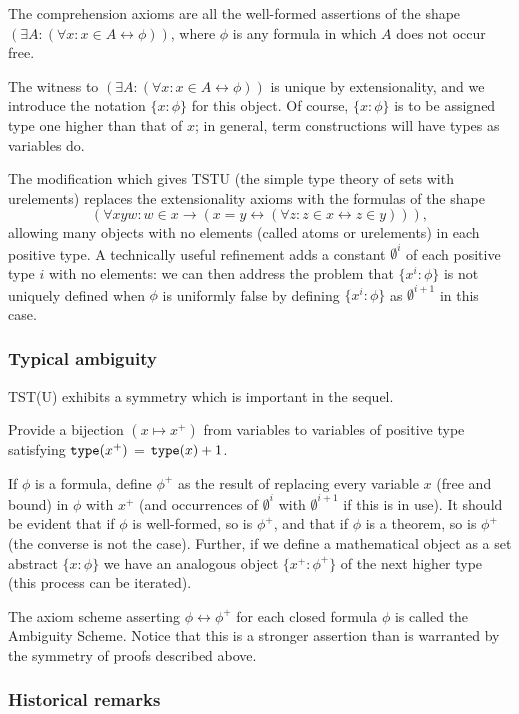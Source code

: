 \documentclass[112pt]{article}
\begin{document}
The comprehension axioms are all the well-formed assertions of the shape $(\exists A:(\forall x:x \in A \leftrightarrow \phi))$, where $\phi$ is any formula in which $A$ does not occur free.

The witness to $(\exists A:(\forall x:x \in A \leftrightarrow \phi))$ is unique by extensionality, and we introduce the notation $\{x:\phi\}$ for this object.  Of course, $\{x:\phi\}$  is to be assigned type one higher than that of $x$;  in general, term constructions will have types as variables do.

The modification which gives TSTU (the simple type theory of sets with urelements) replaces the extensionality axioms with the formulas of the shape $$(\forall xyw:w \in x \rightarrow (x=y \leftrightarrow (\forall z:z \in x \leftrightarrow z\in y))),$$  allowing many objects with no elements (called atoms or urelements)  in each positive type.  A technically useful refinement adds a constant $\emptyset^i$ of each positive type $i$ with no elements:  we can then address the problem that $\{x^i:\phi\}$ is not uniquely defined when $\phi$ is uniformly false by defining $\{x^i:\phi\}$ as $\emptyset^{i+1}$ in this case.

\subsubsection{Typical ambiguity}

TST(U) exhibits a symmetry which is important in the sequel.

Provide a bijection $(x \mapsto x^+)$ from variables to variables of positive type satisfying   ${\tt type}(x^+)$ = ${\tt type}(x)+1$.

If $\phi$ is a formula, define $\phi^+$ as the result of replacing every variable $x$ (free and bound) in $\phi$ with $x^+$ (and occurrences of $\emptyset^i$ with $\emptyset^{i+1}$ if this is in use).   It should be evident that if $\phi$ is well-formed, so is $\phi^+$,
and that if $\phi$ is a theorem, so is $\phi^+$ (the converse is not the case).  Further, if we define a mathematical object as a set abstract $\{x:\phi\}$ we have an analogous
object $\{x^+:\phi^+\}$ of the next higher type (this process can be iterated).

The axiom scheme asserting $\phi \leftrightarrow \phi^+$ for each closed formula $\phi$ is called the Ambiguity Scheme.   Notice that this is a stronger assertion than is warranted by the symmetry of proofs described above.

\subsubsection{Historical remarks}
\end{document}
